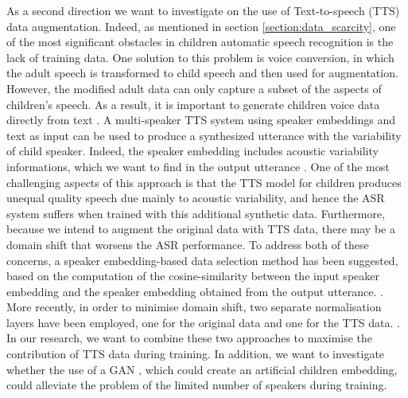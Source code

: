As a second direction we want to investigate on the use of Text-to-speech (TTS) data augmentation. Indeed, as mentioned in section \ref{section:data_scarcity}, one of the most significant obstacles in children automatic speech recognition is the lack of training data. One solution to this problem is voice conversion, in which the adult speech is transformed to child speech and then used for augmentation. However, the modified adult data can only capture a subset of the aspects of children's speech. As a result, it is important to generate children voice data directly from text \cite{wang2021towards}. A multi-speaker TTS system using speaker embeddings and  text  as input can be used to produce a synthesized utterance with the variability of child speaker. Indeed, the speaker embedding includes acoustic variability informations, which we want to find in the output utterance \cite{cooper2020zero,kim2021conditional}. One of the most challenging aspects of this approach is that the TTS model for children produces unequal quality speech due mainly to acoustic variability, and hence the ASR system suffers when trained with this additional synthetic data. Furthermore, because we intend to augment the original data with TTS data, there may be a domain shift that worsens the ASR performance. To address both of these concerns, a speaker embedding-based data selection method has been suggested, based on the computation of the cosine-similarity between the input speaker embedding and the speaker embedding obtained from the output utterance. \cite{wang2021towards}. More recently, in order to minimise domain shift, two separate normalisation layers have been employed, one for the original data and one for the TTS data. \cite{hu2022synt++}. In our research, we want to combine these two approaches to maximise the contribution of TTS data during training. In addition, we want to investigate whether the use of a GAN \cite{goodfellow2014generative}, which could create an artificial children embedding, could alleviate the problem of the limited number of speakers during training.
